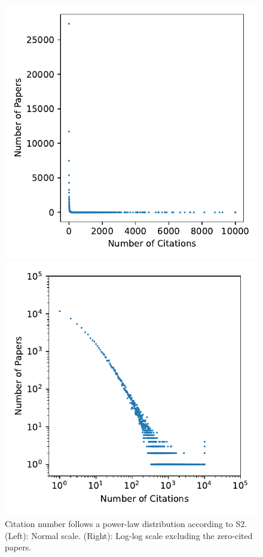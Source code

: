 \begin{figure}
    \centering
    \begin{minipage}{0.48\textwidth}
        \includegraphics[width=\textwidth]{images/s2_dist.pdf}
    \end{minipage}%
    \begin{minipage}{0.48\textwidth}
        \includegraphics[width=\textwidth]{images/s2_dist_log.pdf}
    \end{minipage}
    \caption{Citation number follows a power-law distribution according to S2.
    (Left): Normal scale. (Right): Log-log scale excluding the zero-cited papers.}
    \label{fig:s2_dist}
\end{figure}


